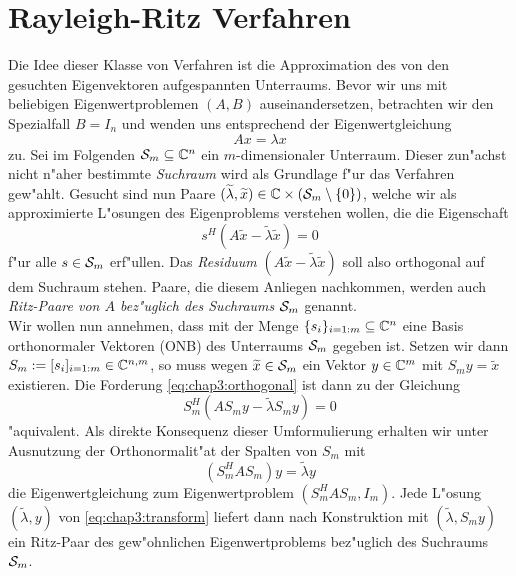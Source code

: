 \section{Rayleigh-Ritz Verfahren}\label{sec:chap3:rayleighRitz}
Die Idee dieser Klasse von Verfahren ist die Approximation des von
den gesuchten Eigenvektoren aufgespannten Unterraums.
Bevor wir uns mit beliebigen Eigenwertproblemen $(A,B)$ auseinandersetzen, betrachten wir den Spezialfall $B=I_n$ und wenden uns entsprechend der Eigenwertgleichung
\[
Ax = \lambda x
\]
zu. Sei im Folgenden $\S_m\subseteq\Cn$ ein $m$-dimensionaler Unterraum. Dieser zun"achst nicht
n"aher bestimmte \emph{Suchraum} wird als Grundlage f"ur das Verfahren gew"ahlt.
Gesucht sind nun Paare $(\widetilde{\lambda}, \widetilde{x})\in\C\times (\S_m \setminus\{0\})$,
welche wir als approximierte L"osungen des Eigenproblems verstehen wollen, die
die Eigenschaft
\begin{equation}\label{eq:chap3:orthogonal}
s^H(A\widetilde{x} - \widetilde{\lambda}\widetilde{x})=0
\end{equation}
f"ur alle $s \in \S_m $ erf"ullen. Das \emph{Residuum} $(A\widetilde{x} - \widetilde{\lambda}\widetilde{x})$
soll also orthogonal auf dem Suchraum stehen. Paare, die diesem Anliegen nachkommen,
werden auch \emph{Ritz-Paare von $A$ bez"uglich des Suchraums $\S_m$} genannt.\\

Wir wollen nun annehmen, dass mit der Menge $\{s_i\}_{i=1:m}\subseteq \Cn$ eine Basis orthonormaler Vektoren (ONB) des Unterraums $\S_m$ gegeben ist. Setzen wir dann $S_m :=[s_i]_{i=1:m}\in\C^{n,m}$, so muss wegen $\widetilde{x}\in\S_m$
ein Vektor $y\in\C^m$ mit $S_m y = \widetilde{x}$ existieren. Die Forderung \eqref{eq:chap3:orthogonal}
ist dann zu der Gleichung
\[
S_m^H(AS_m y - \widetilde{\lambda} S_m y) = 0
\]
"aquivalent. Als direkte Konsequenz dieser Umformulierung erhalten wir unter Ausnutzung
der Orthonormalit"at der Spalten von $S_m$ mit
\begin{equation}\label{eq:chap3:transform}
(S_m^H A S_m) y = \widetilde{\lambda}y
\end{equation}
die Eigenwertgleichung zum Eigenwertproblem $(S_m^H A S_m, I_m)$. Jede L"osung $(\widetilde{\lambda},y)$ von \eqref{eq:chap3:transform}
liefert dann nach Konstruktion mit $(\widetilde{\lambda}, S_m y)$ ein Ritz-Paar des gew"ohnlichen
Eigenwertproblems bez"uglich des Suchraums $\S_m$.\\

